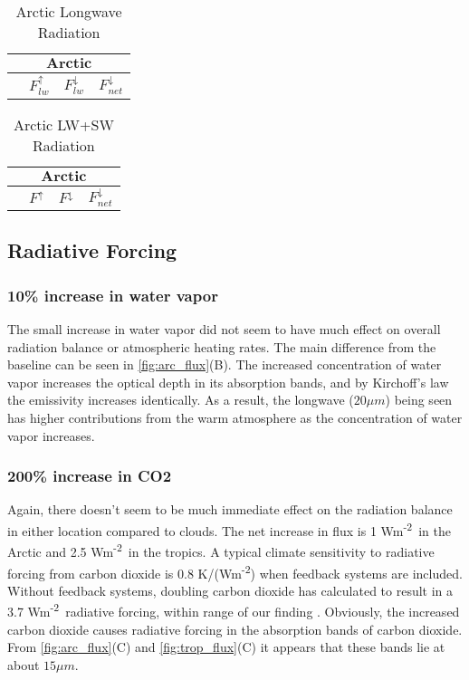 \documentclass[twocol]{ametsoc}
\newcommand{\FU}{Wm\textsuperscript{-2}}
\begin{document}
\begin{table}[h]
    \centering
    \caption{Arctic Longwave Radiation}
    \label{tab:alr}
    \begin{tabular}{lccc}
        \toprule
        \multicolumn{4}{c}{$\textbf{Arctic}$}\\
        \midrule
        & $F^\uparrow_{lw}$ & $F^\downarrow_{lw}$ & $F^\downarrow_{net}$\\
        \midrule
        
        \bottomrule
    \end{tabular}

\end{table}

\begin{table}[h]
    \centering
    \caption{Arctic LW+SW Radiation}
    \label{tab:acr}
    \begin{tabular}{lccc}
        \toprule
        \multicolumn{4}{c}{$\textbf{Arctic}$}\\
        \midrule
        & $F^\uparrow$ & $F^\downarrow$ & $F^\downarrow_{net}$\\
        \midrule
        
        \bottomrule
    \end{tabular}

\end{table}

\subsection*{Radiative Forcing}
\subsubsection{10\% increase in water vapor}
The small increase in water vapor did not seem to have much effect on overall radiation balance or atmospheric heating rates. The main difference from the baseline can be seen in \autoref{fig:arc_flux}(B). The increased concentration of water vapor increases the optical depth in its absorption bands, and by Kirchoff’s law the emissivity increases identically. As a result, the longwave ($20\mu m$) being seen has higher contributions from the warm atmosphere as the concentration of water vapor increases.

\subsubsection{200\% increase in CO2}
Again, there doesn't seem to be much immediate effect on the radiation balance in either location compared to clouds. The net increase in flux is 1 \FU~in the Arctic and 2.5 \FU~in the tropics. A typical climate sensitivity to radiative forcing from carbon dioxide is 0.8 K/(\FU) when feedback systems are included. Without feedback systems, doubling carbon dioxide has calculated to result in a 3.7 \FU~radiative forcing, within range of our finding \citep{rahmstorf:2008}.
Obviously, the increased carbon dioxide causes radiative forcing in the absorption bands of carbon dioxide. From \autoref{fig:arc_flux}(C) and \autoref{fig:trop_flux}(C) it appears that these bands lie at about $15\mu m$.
\end{document}
